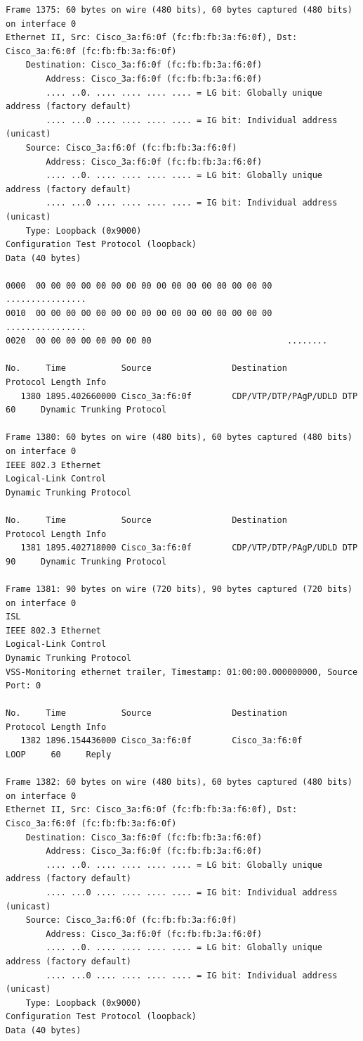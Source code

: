 \documentclass[a4paper,11pt]{article}
\begin{document}
\begin{lstlisting}
Frame 1375: 60 bytes on wire (480 bits), 60 bytes captured (480 bits) on interface 0
Ethernet II, Src: Cisco_3a:f6:0f (fc:fb:fb:3a:f6:0f), Dst: Cisco_3a:f6:0f (fc:fb:fb:3a:f6:0f)
    Destination: Cisco_3a:f6:0f (fc:fb:fb:3a:f6:0f)
        Address: Cisco_3a:f6:0f (fc:fb:fb:3a:f6:0f)
        .... ..0. .... .... .... .... = LG bit: Globally unique address (factory default)
        .... ...0 .... .... .... .... = IG bit: Individual address (unicast)
    Source: Cisco_3a:f6:0f (fc:fb:fb:3a:f6:0f)
        Address: Cisco_3a:f6:0f (fc:fb:fb:3a:f6:0f)
        .... ..0. .... .... .... .... = LG bit: Globally unique address (factory default)
        .... ...0 .... .... .... .... = IG bit: Individual address (unicast)
    Type: Loopback (0x9000)
Configuration Test Protocol (loopback)
Data (40 bytes)

0000  00 00 00 00 00 00 00 00 00 00 00 00 00 00 00 00   ................
0010  00 00 00 00 00 00 00 00 00 00 00 00 00 00 00 00   ................
0020  00 00 00 00 00 00 00 00                           ........

No.     Time           Source                Destination           Protocol Length Info
   1380 1895.402660000 Cisco_3a:f6:0f        CDP/VTP/DTP/PAgP/UDLD DTP      60     Dynamic Trunking Protocol

Frame 1380: 60 bytes on wire (480 bits), 60 bytes captured (480 bits) on interface 0
IEEE 802.3 Ethernet 
Logical-Link Control
Dynamic Trunking Protocol

No.     Time           Source                Destination           Protocol Length Info
   1381 1895.402718000 Cisco_3a:f6:0f        CDP/VTP/DTP/PAgP/UDLD DTP      90     Dynamic Trunking Protocol

Frame 1381: 90 bytes on wire (720 bits), 90 bytes captured (720 bits) on interface 0
ISL
IEEE 802.3 Ethernet 
Logical-Link Control
Dynamic Trunking Protocol
VSS-Monitoring ethernet trailer, Timestamp: 01:00:00.000000000, Source Port: 0

No.     Time           Source                Destination           Protocol Length Info
   1382 1896.154436000 Cisco_3a:f6:0f        Cisco_3a:f6:0f        LOOP     60     Reply

Frame 1382: 60 bytes on wire (480 bits), 60 bytes captured (480 bits) on interface 0
Ethernet II, Src: Cisco_3a:f6:0f (fc:fb:fb:3a:f6:0f), Dst: Cisco_3a:f6:0f (fc:fb:fb:3a:f6:0f)
    Destination: Cisco_3a:f6:0f (fc:fb:fb:3a:f6:0f)
        Address: Cisco_3a:f6:0f (fc:fb:fb:3a:f6:0f)
        .... ..0. .... .... .... .... = LG bit: Globally unique address (factory default)
        .... ...0 .... .... .... .... = IG bit: Individual address (unicast)
    Source: Cisco_3a:f6:0f (fc:fb:fb:3a:f6:0f)
        Address: Cisco_3a:f6:0f (fc:fb:fb:3a:f6:0f)
        .... ..0. .... .... .... .... = LG bit: Globally unique address (factory default)
        .... ...0 .... .... .... .... = IG bit: Individual address (unicast)
    Type: Loopback (0x9000)
Configuration Test Protocol (loopback)
Data (40 bytes)


\end{lstlisting}
\end{document}
